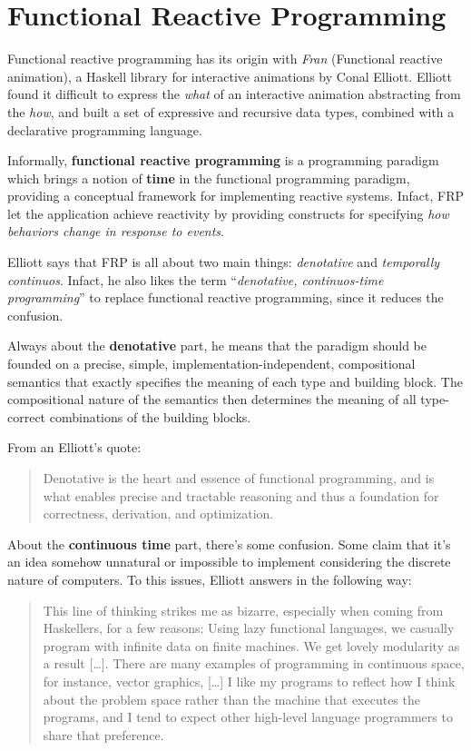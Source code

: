 \section{Functional Reactive
Programming}\label{functional-reactive-programming}

Functional reactive programming has its origin with \emph{Fran}
(Functional reactive animation), a Haskell library for interactive
animations by Conal Elliott. Elliott found it difficult to express the
\emph{what} of an interactive animation abstracting from the \emph{how},
and built a set of expressive and recursive data types, combined with a
declarative programming language.

Informally, \textbf{functional reactive programming} is a programming
paradigm which brings a notion of \textbf{time} in the functional
programming paradigm, providing a conceptual framework for implementing
reactive systems. Infact, FRP let the application achieve reactivity by
providing constructs for specifying \emph{how behaviors change in
response to events}.

Elliott says that FRP is all about two main things: \emph{denotative}
and \emph{temporally continuos}. Infact, he also likes the term
``\emph{denotative, continuos-time programming}'' to replace functional
reactive programming, since it reduces the confusion.

Always about the \textbf{denotative} part, he means that the paradigm
should be founded on a precise, simple, implementation-independent,
compositional semantics that exactly specifies the meaning of each type
and building block. The compositional nature of the semantics then
determines the meaning of all type-correct combinations of the building
blocks.

From an Elliott's quote: 

\begin{quote}
Denotative is the heart and
essence of functional programming, and is what enables precise and
tractable reasoning and thus a foundation for correctness, derivation,
and optimization.
\end{quote}

About the \textbf{continuous time} part, there's some confusion. Some
claim that it's an idea somehow unnatural or impossible to implement
considering the discrete nature of computers. To this issues, Elliott
answers in the following way:

\begin{quote}
This line of thinking strikes me as bizarre, especially when coming from
Haskellers, for a few reasons: Using lazy functional languages, we
casually program with infinite data on finite machines. We get lovely
modularity as a result {[}\ldots{}{]}. There are many examples of
programming in continuous space, for instance, vector graphics,
{[}\ldots{}{]} I like my programs to reflect how I think about the
problem space rather than the machine that executes the programs, and I
tend to expect other high-level language programmers to share that
preference.
\end{quote}

